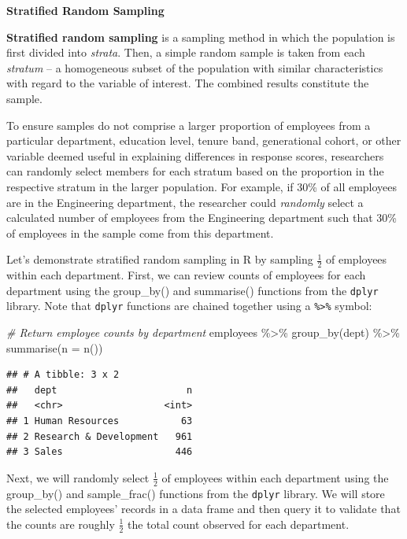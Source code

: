 \documentclass[
]{book}
\newenvironment{Shaded}{\begin{snugshade}}{\end{snugshade}}
\newcommand{\AttributeTok}[1]{\textcolor[rgb]{0.77,0.63,0.00}{#1}}
\newcommand{\CommentTok}[1]{\textcolor[rgb]{0.56,0.35,0.01}{\textit{#1}}}
\newcommand{\FunctionTok}[1]{\textcolor[rgb]{0.00,0.00,0.00}{#1}}
\newcommand{\NormalTok}[1]{#1}
\newcommand{\SpecialCharTok}[1]{\textcolor[rgb]{0.00,0.00,0.00}{#1}}
\begin{document}
\textbf{Stratified Random Sampling}

\textbf{Stratified random sampling} is a sampling method in which the population is first divided into \emph{strata}. Then, a simple random sample is taken from each \emph{stratum} -- a homogeneous subset of the population with similar characteristics with regard to the variable of interest. The combined results constitute the sample.

To ensure samples do not comprise a larger proportion of employees from a particular department, education level, tenure band, generational cohort, or other variable deemed useful in explaining differences in response scores, researchers can randomly select members for each stratum based on the proportion in the respective stratum in the larger population. For example, if 30\% of all employees are in the Engineering department, the researcher could \emph{randomly} select a calculated number of employees from the Engineering department such that 30\% of employees in the sample come from this department.

Let's demonstrate stratified random sampling in R by sampling \(\frac{1}{2}\) of employees within each department. First, we can review counts of employees for each department using the group\_by() and summarise() functions from the \texttt{dplyr} library. Note that \texttt{dplyr} functions are chained together using a \texttt{\%\textgreater{}\%} symbol:

\begin{Shaded}
\begin{Highlighting}[]
\CommentTok{\# Return employee counts by department}
\NormalTok{employees }\SpecialCharTok{\%\textgreater{}\%}
\FunctionTok{group\_by}\NormalTok{(dept) }\SpecialCharTok{\%\textgreater{}\%}
\FunctionTok{summarise}\NormalTok{(}\AttributeTok{n =} \FunctionTok{n}\NormalTok{())}
\end{Highlighting}
\end{Shaded}

\begin{verbatim}
## # A tibble: 3 x 2
##   dept                       n
##   <chr>                  <int>
## 1 Human Resources           63
## 2 Research & Development   961
## 3 Sales                    446
\end{verbatim}

Next, we will randomly select \(\frac{1}{2}\) of employees within each department using the group\_by() and sample\_frac() functions from the \texttt{dplyr} library. We will store the selected employees' records in a data frame and then query it to validate that the counts are roughly \(\frac{1}{2}\) the total count observed for each department.
\end{document}
